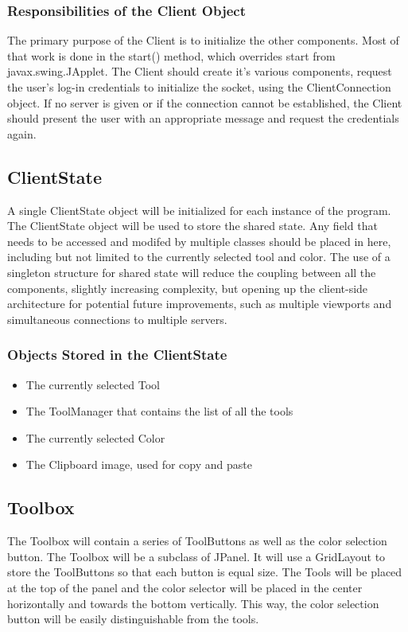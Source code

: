 \documentclass[11pt,oneside,a4paper]{article}
\begin{document}
 \subsubsection{Responsibilities of the Client Object}
The primary purpose of the Client is to initialize the other components. Most
of that work is done in the start() method, which overrides start from
javax.swing.JApplet. The Client should create it's various components, request
the user's log-in credentials to initialize the socket, using the
ClientConnection object. If no server is given or if the connection cannot be
established, the Client should present the user with an appropriate message and
request the credentials again.
 \subsection{ClientState}
  A single ClientState object will be initialized for each instance of the
  program. The ClientState object will be used to store the shared state. Any
  field that needs to be accessed and modifed by multiple classes should be
  placed in here, including but not limited to the currently selected tool and
  color. The use of a singleton structure for shared state will reduce the
  coupling between all the components, slightly increasing complexity, but
  opening up the client-side architecture for potential future improvements, such
  as multiple viewports and simultaneous connections to multiple servers.
  \subsubsection{Objects Stored in the ClientState}
  \begin{itemize}
  \item
  The currently selected Tool
  \item 
  The ToolManager that contains the list of all the tools
  \item 
  The currently selected Color
  \item
  The Clipboard image, used for copy and paste
  \end{itemize}

 \subsection{Toolbox}
  The Toolbox will contain a series of ToolButtons as well as the color
  selection button. The Toolbox will be a subclass of JPanel. It will use a
  GridLayout to store the ToolButtons so that each button is equal size. The
  Tools will be placed at the top of the panel and the color selector will be
  placed in the center horizontally and towards the bottom vertically. This
  way, the color selection button will be easily distinguishable from the
  tools. 
  
\end{document}
